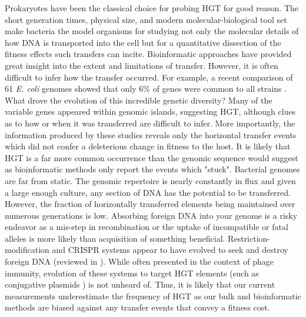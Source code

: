 Prokaryotes have been the classical choice for probing HGT for good reason.
The short generation times, physical size, and modern molecular-biological tool
set make bacteria the model organisms for studying not only the molecular
details of how DNA is transported into the cell but for a quantitative
dissection of the fitness effects such transfers can incite. Bioinformatic
approaches have provided great insight into the extent and limitations of
transfer. However, it is often difficult to infer how the transfer
occurred. For example, a recent comparison of 61 \textit{E. coli} genomes showed
that only 6\% of genes were common to all strains \cite{Lukjancenko:2010gd}.
What drove the evolution of this incredible genetic diversity? Many of the variable
genes appeared within genomic islands, suggesting HGT, although clues as to how
or when it was transferred are difficult to infer. More importantly, the
information produced by these studies reveals only the horizontal transfer events
which did not confer a deleterious change in fitness to the host. It is likely
that HGT is a far more common occurrence than the genomic sequence would suggest
as bioinformatic methods only report the events which "stuck". Bacterial genomes
are far from static. The genomic repertoire is nearly constantly in flux
and given a large enough culture, any section of DNA has the potential to be
transferred. However, the fraction of horizontally transferred elements being
maintained over numerous generations is low. Absorbing foreign
DNA into your genome is a risky endeavor as a mis-step in recombination or the
uptake of incompatible or fatal alleles is more likely than acquisition of
something beneficial. Restriction-modification and CRISPR systems appear
to have evolved to seek and destroy foreign DNA (reviewed in
\citet{Samson:2013hu}). While often presented in the context of phage immunity,
evolution of these systems to target HGT elements (such as conjugative
plasmids \cite{Marraffini:2008vm}) is not unheard of. Thus, it is likely that our
current measurements underestimate the frequency of HGT as our bulk and
bioinformatic methods are biased against any transfer events that convey a
fitness cost.

